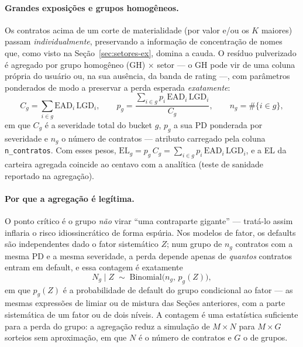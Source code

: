 \documentclass[11pt,a4paper]{article}
\begin{document}
\paragraph{Grandes exposições e grupos homogêneos.} Os contratos acima de um corte de materialidade (por valor e/ou os $K$ maiores) passam \emph{individualmente}, preservando a informação de concentração de nomes que, como visto na Seção~\ref{sec:setores-ex}, domina a cauda. O resíduo pulverizado é agregado por grupo homogêneo (GH) $\times$ setor --- o GH pode vir de uma coluna própria do usuário ou, na sua ausência, da banda de rating ---, com parâmetros ponderados de modo a preservar a perda esperada \emph{exatamente}:
\begin{equation}
C_g=\sum_{i\in g}\mathrm{EAD}_i\,\mathrm{LGD}_i,
\qquad
p_g=\frac{\sum_{i\in g} p_i\,\mathrm{EAD}_i\,\mathrm{LGD}_i}{C_g},
\qquad
n_g=\#\{i\in g\},
\label{eq:agg}
\end{equation}
em que $C_g$ é a severidade total do bucket $g$, $p_g$ a sua PD ponderada por severidade e $n_g$ o número de contratos --- atributo carregado pela coluna \texttt{n\_contratos}. Com esses pesos, $\mathrm{EL}_g=p_g\,C_g=\sum_{i\in g}p_i\,\mathrm{EAD}_i\,\mathrm{LGD}_i$, e a EL da carteira agregada coincide ao centavo com a analítica (teste de sanidade reportado na agregação).

\paragraph{Por que a agregação é legítima.} O ponto crítico é o grupo \emph{não} virar ``uma contraparte gigante'' --- tratá-lo assim inflaria o risco idiossincrático de forma espúria. Nos modelos de fator, os defaults são independentes dado o fator sistemático $Z$; num grupo de $n_g$ contratos com a mesma PD e a mesma severidade, a perda depende apenas de \emph{quantos} contratos entram em default, e essa contagem é exatamente
\begin{equation}
N_g\mid Z\;\sim\;\mathrm{Binomial}\bigl(n_g,\,p_g(Z)\bigr),
\label{eq:binom-cond}
\end{equation}
em que $p_g(Z)$ é a probabilidade de default do grupo condicional ao fator --- as mesmas expressões de limiar ou de mistura das Seções anteriores, com a parte sistemática de um fator ou de dois níveis. A contagem é uma estatística suficiente para a perda do grupo: a agregação reduz a simulação de $M\times N$ para $M\times G$ sorteios sem aproximação, em que $N$ é o número de contratos e $G$ o de grupos.
\end{document}
